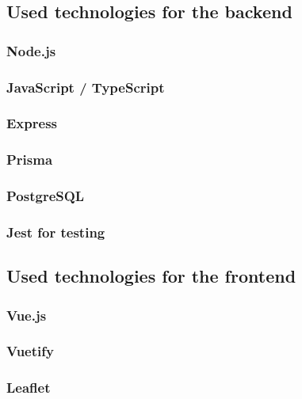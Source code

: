 
\subsection{Used technologies for the backend}


\subsubsection{Node.js}

\subsubsection{JavaScript / TypeScript}

\subsubsection{Express}

\subsubsection{Prisma}

\subsubsection{PostgreSQL}

\subsubsection{Jest for testing}

\subsection{Used technologies for the frontend}

\subsubsection{Vue.js}

\subsubsection{Vuetify}

\subsubsection{Leaflet}